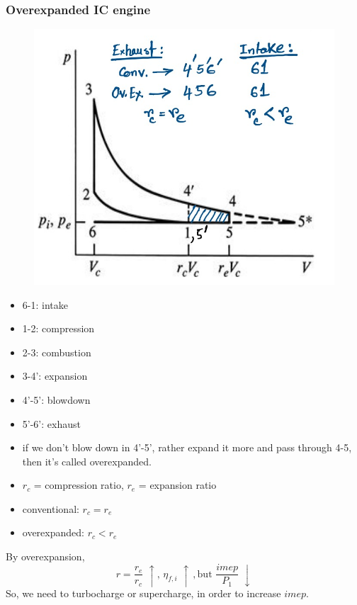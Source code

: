\documentclass{article}
\begin{document}
	\subsubsection*{Overexpanded IC engine}
	\begin{multicols}{2}
		\begin{figure}[H]
			\begin{center}
				\includegraphics[width=\linewidth]{img/overexpanded.jpeg}
			\end{center}
		\end{figure}
		\begin{itemize}
			\item 6-1: intake 
			\item 1-2: compression 
			\item 2-3: combustion
			\item 3-4': expansion 
			\item 4'-5': blowdown 
			\item 5'-6': exhaust
			\item if we don't blow down in 4'-5', rather expand it more and pass through 4-5, then it's called overexpanded.
			\item $r_c$ = compression ratio, $r_e$ = expansion ratio
			\item conventional: $r_c = r_e$
			\item overexpanded: $r_c < r_e$
		\end{itemize}
		By overexpansion,
		$$r=\frac{r_e}{r_c} \, \, \uparrow, \, \eta_{f,i} \,\, \uparrow \, ,\text{but } \frac{imep}{P_1} \,\,\downarrow$$
		So, we need to turbocharge or supercharge, in order to increase $imep$. 


\end{multicols}
\end{document}
